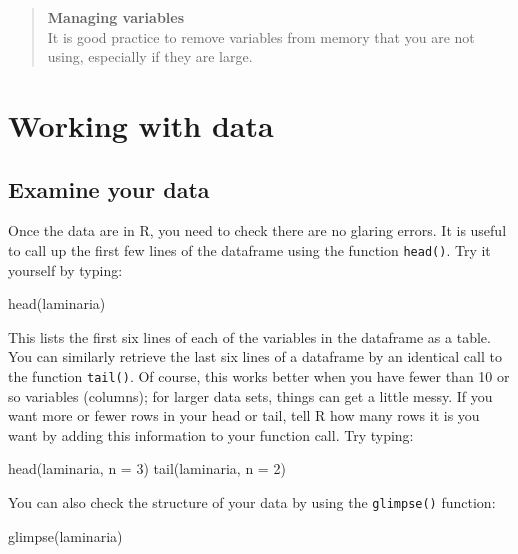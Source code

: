 \documentclass[
]{book}
\newenvironment{Shaded}{\begin{snugshade}}{\end{snugshade}}
\newcommand{\AttributeTok}[1]{\textcolor[rgb]{0.77,0.63,0.00}{#1}}
\newcommand{\DecValTok}[1]{\textcolor[rgb]{0.00,0.00,0.81}{#1}}
\newcommand{\FunctionTok}[1]{\textcolor[rgb]{0.00,0.00,0.00}{#1}}
\newcommand{\NormalTok}[1]{#1}
\begin{document}
\begin{quote}
\textbf{Managing variables}\\
It is good practice to remove variables from memory that you are not using, especially if they are large.
\end{quote}

\hypertarget{working-with-data}{%
\section{Working with data}\label{working-with-data}}

\hypertarget{examine-your-data}{%
\subsection{Examine your data}\label{examine-your-data}}

Once the data are in R, you need to check there are no glaring errors. It is useful to call up the first few lines of the dataframe using the function \texttt{head()}. Try it yourself by typing:

\begin{Shaded}
\begin{Highlighting}[]
\FunctionTok{head}\NormalTok{(laminaria)}
\end{Highlighting}
\end{Shaded}

This lists the first six lines of each of the variables in the dataframe as a table. You can similarly retrieve the last six lines of a dataframe by an identical call to the function \texttt{tail()}. Of course, this works better when you have fewer than 10 or so variables (columns); for larger data sets, things can get a little messy. If you want more or fewer rows in your head or tail, tell R how many rows it is you want by adding this information to your function call. Try typing:

\begin{Shaded}
\begin{Highlighting}[]
\FunctionTok{head}\NormalTok{(laminaria, }\AttributeTok{n =} \DecValTok{3}\NormalTok{)}
\FunctionTok{tail}\NormalTok{(laminaria, }\AttributeTok{n =} \DecValTok{2}\NormalTok{)}
\end{Highlighting}
\end{Shaded}

You can also check the structure of your data by using the \texttt{glimpse()} function:

\begin{Shaded}
\begin{Highlighting}[]
\FunctionTok{glimpse}\NormalTok{(laminaria)}
\end{Highlighting}
\end{Shaded}
\end{document}
